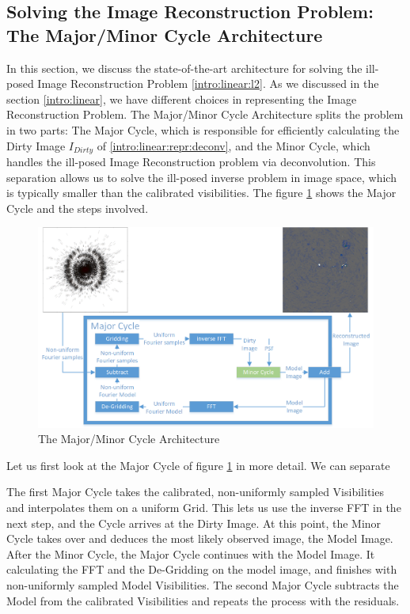 \subsection{Solving the Image Reconstruction Problem: The Major/Minor Cycle Architecture}
In this section, we discuss the state-of-the-art architecture for solving the ill-posed Image Reconstruction Problem \eqref{intro:linear:l2}.
As we discussed in the section \ref{intro:linear}, we have different choices in representing the Image Reconstruction Problem. The Major/Minor Cycle Architecture splits the problem in two parts: The Major Cycle, which is responsible for efficiently calculating the Dirty Image $I_{Dirty}$ of \eqref{intro:linear:repr:deconv}, and the Minor Cycle, which handles the ill-posed Image Reconstruction problem via deconvolution. 
This separation allows us to solve the ill-posed inverse problem in image space, which is typically smaller than the calibrated visibilities. The figure \ref{intro:major} shows the Major Cycle and the steps involved.

\begin{figure}[h]
	\centering
	\includegraphics[width=0.80\linewidth]{./chapters/02.hypo/Major-Minor3.png}
	\caption{The Major/Minor Cycle Architecture}
	\label{intro:major}
\end{figure}

Let us first look at the Major Cycle of figure \ref{intro:major} in more detail. We can separate


The first Major Cycle takes the calibrated, non-uniformly sampled Visibilities and interpolates them on a uniform Grid. This lets us use the inverse FFT in the next step, and the Cycle arrives at the Dirty Image. At this point, the Minor Cycle takes over and deduces the most likely observed image, the Model Image. After the Minor Cycle, the Major Cycle continues with the Model Image. It calculating the FFT and the De-Gridding on the model image, and finishes with non-uniformly sampled Model Visibilities. The second Major Cycle subtracts the Model from the calibrated Visibilities and repeats the process with the residuals.

